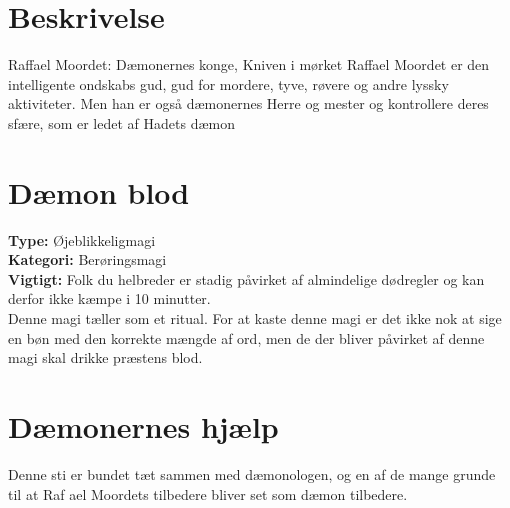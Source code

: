 \section*{Beskrivelse}
Raffael Moordet: Dæmonernes konge, Kniven i mørket Raffael Moordet er den intelligente ondskabs
gud, gud for mordere, tyve, røvere og andre lyssky aktiviteter. Men han er også dæmonernes Herre og
mester og kontrollere deres sfære, som er ledet af Hadets dæmon

\section*{Dæmon blod}
\textbf{Type:} Øjeblikkeligmagi\\
\textbf{Kategori:} Berøringsmagi\\
\textbf{Vigtigt:} Folk du helbreder er stadig påvirket af almindelige dødregler og kan derfor ikke kæmpe i 10 minutter.\\
Denne magi tæller som et ritual. For at kaste denne magi er det ikke nok at sige en bøn med den korrekte mængde af ord, men de der bliver påvirket af denne magi skal drikke præstens blod.

\section*{Dæmonernes hjælp}
Denne sti er bundet tæt sammen med dæmonologen, og en af de mange grunde til at Raf ael Moordets tilbedere bliver set som dæmon tilbedere.\\
